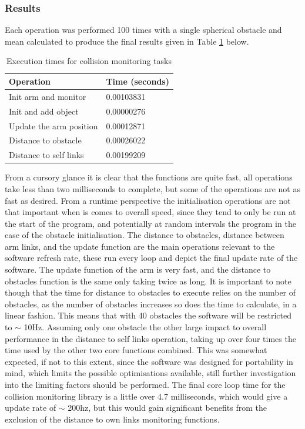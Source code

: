 \documentclass[a4paper, 10pt, conference]{ieeeconf}      %
\begin{document}
\subsubsection{Results}
Each operation was performed 100 times with a single spherical obstacle and mean calculated to produce the final results given in Table \ref{table:Function Times} below.

\begin{table}[H]
	\centering
	\begin{tabular}{|l|l|}
		\hline
		Operation & Time (seconds) \\ \hline
		Init arm and monitor   & 0.00103831     \\ \hline
		Init and add object    & 0.00000276     \\ \hline
		Update the arm position& 0.00012871     \\ \hline
		Distance to obstacle   & 0.00026022     \\ \hline
		Distance to self links & 0.00199209     \\ \hline
	\end{tabular}
	\caption{Execution times for collision monitoring tasks}
	\label{table:Function Times}
\end{table}
From a cursory glance it is clear that the functions are quite fast, all operations take less than two milliseconds to complete, but some of the operations are not as fast as desired. From a runtime perspective the initialisation operations are not that important when is comes to overall speed, since they tend to only be run at the start of the program, and potentially at random intervals the program in the case of the obstacle initialisation. The distance to obstacles, distance between arm links, and the update function are the main operations relevant to the software refresh rate, these run every loop and depict the final update rate of the software. The update function of the arm is very fast, and the distance to obstacles function is the same only taking twice as long. It is important to note though that the time for distance to obstacles to execute relies on the number of obstacles, as the number of obstacles increases so does the time to calculate, in a linear fashion. This means that with 40 obstacles the software will be restricted to $\sim$ 10Hz. Assuming only one obstacle the other large impact to overall performance in the distance to self links operation, taking up over four times the time used by the other two core functions combined. This was somewhat expected, if not to this extent, since the software was designed for portability in mind, which limits the possible optimisations available, still further investigation into the limiting factors should be performed. The final core loop time for the collision monitoring library is a little over 4.7 milliseconds, which would give a update rate of $\sim$ 200hz, but this would gain significant benefits from the exclusion of the distance to own links monitoring functions.
\end{document}
